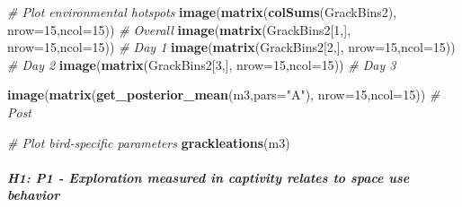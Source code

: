 \documentclass[]{article}
\newenvironment{Shaded}{\begin{snugshade}}{\end{snugshade}}
\newcommand{\KeywordTok}[1]{\textcolor[rgb]{0.13,0.29,0.53}{\textbf{#1}}}
\newcommand{\DataTypeTok}[1]{\textcolor[rgb]{0.13,0.29,0.53}{#1}}
\newcommand{\DecValTok}[1]{\textcolor[rgb]{0.00,0.00,0.81}{#1}}
\newcommand{\StringTok}[1]{\textcolor[rgb]{0.31,0.60,0.02}{#1}}
\newcommand{\CommentTok}[1]{\textcolor[rgb]{0.56,0.35,0.01}{\textit{#1}}}
\newcommand{\NormalTok}[1]{#1}
\let\oldparagraph\paragraph
\renewcommand{\paragraph}[1]{\oldparagraph{#1}\mbox{}}
\begin{document}
\begin{Shaded}
\begin{Highlighting}[]
\CommentTok{# Plot environmental hotspots}
\KeywordTok{image}\NormalTok{(}\KeywordTok{matrix}\NormalTok{(}\KeywordTok{colSums}\NormalTok{(GrackBins2), }\DataTypeTok{nrow=}\DecValTok{15}\NormalTok{,}\DataTypeTok{ncol=}\DecValTok{15}\NormalTok{)) }\CommentTok{# Overall}
\KeywordTok{image}\NormalTok{(}\KeywordTok{matrix}\NormalTok{(GrackBins2[}\DecValTok{1}\NormalTok{,], }\DataTypeTok{nrow=}\DecValTok{15}\NormalTok{,}\DataTypeTok{ncol=}\DecValTok{15}\NormalTok{)) }\CommentTok{# Day 1}
\KeywordTok{image}\NormalTok{(}\KeywordTok{matrix}\NormalTok{(GrackBins2[}\DecValTok{2}\NormalTok{,], }\DataTypeTok{nrow=}\DecValTok{15}\NormalTok{,}\DataTypeTok{ncol=}\DecValTok{15}\NormalTok{)) }\CommentTok{# Day 2}
\KeywordTok{image}\NormalTok{(}\KeywordTok{matrix}\NormalTok{(GrackBins2[}\DecValTok{3}\NormalTok{,], }\DataTypeTok{nrow=}\DecValTok{15}\NormalTok{,}\DataTypeTok{ncol=}\DecValTok{15}\NormalTok{)) }\CommentTok{# Day 3}

\KeywordTok{image}\NormalTok{(}\KeywordTok{matrix}\NormalTok{(}\KeywordTok{get_posterior_mean}\NormalTok{(m3,}\DataTypeTok{pars=}\StringTok{"A"}\NormalTok{), }\DataTypeTok{nrow=}\DecValTok{15}\NormalTok{,}\DataTypeTok{ncol=}\DecValTok{15}\NormalTok{)) }\CommentTok{# Post}

\CommentTok{# Plot bird-specific parameters}
\KeywordTok{grackleations}\NormalTok{(m3)}
\end{Highlighting}
\end{Shaded}

\paragraph{\texorpdfstring{\emph{H1: P1 - Exploration measured in
captivity relates to space use
behavior}}{H1: P1 - Exploration measured in captivity relates to space use behavior}}\label{h1-p1---exploration-measured-in-captivity-relates-to-space-use-behavior}
\end{document}
